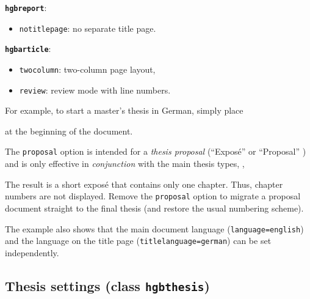 \documentclass[english]{hgbarticle}
\begin{document}
\noindent\textbf{\texttt{hgbreport}}:
	\begin{itemize}
		\item \texttt{notitlepage}: no separate title page.
	\end{itemize}
		
\noindent\textbf{\texttt{hgbarticle}}:
	\begin{itemize}
		\item \texttt{twocolumn}: two-column page layout,
		\item \texttt{review}: review mode with line numbers.
	\end{itemize}

\noindent
For example, to start a master's thesis in German, simply place
%
%
at the beginning of the document.

The \texttt{proposal} option is intended for a \emph{thesis proposal} (``Exposé'' or ``Proposal'' ) and is 
only effective in \emph{conjunction} with the main thesis types, \eg,
%
%
The result is a short exposé that contains only one chapter. Thus,
chapter numbers are not displayed. Remove the \texttt{proposal} option to
migrate a proposal document straight to the final thesis (and restore the usual
numbering scheme).

The example also shows that the main document language (\texttt{language=english}) and the
language on the title page (\texttt{titlelanguage=german}) can be set independently.

\subsection{Thesis settings (class \texttt{hgbthesis})}
\end{document}
